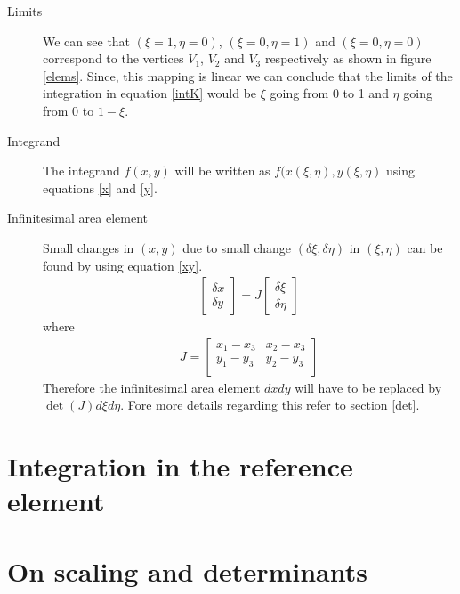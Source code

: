 \documentclass{article}
\begin{document}
\begin{description}
\item[Limits]
  We can see that
  $(\xi = 1, \eta = 0)$,
  $(\xi = 0, \eta = 1)$ and
  $(\xi = 0, \eta = 0)$
  correspond to the vertices
  $V_1$, $V_2$ and $V_3$ respectively
  as shown in figure \ref{elems}.
  Since, this mapping is linear we can conclude that
  the limits of the integration in equation \ref{intK}
  would be $\xi$ going from 0 to 1
  and $\eta$ going from 0 to $1 - \xi$.

\item[Integrand]
  The integrand $f(x,y)$
  will be written as $f(x(\xi,\eta), y(\xi,\eta)$
  using equations \ref{x} and \ref{y}.

\item[Infinitesimal area element]
  Small changes in $(x,y)$
  due to small change $(\delta \xi, \delta \eta)$ in $(\xi,\eta)$
  can be found by using equation \ref{xy}.
  \begin{align*}
    \begin{bmatrix} \delta x \\ \delta y \end{bmatrix} =
    J \begin{bmatrix} \delta \xi \\ \delta \eta \end{bmatrix}
  \end{align*}
  where
  \begin{align*}
    J = \begin{bmatrix}
      x_1 - x_3 & x_2 - x_3 \\
      y_1 - y_3 & y_2 - y_3 \\
    \end{bmatrix}
  \end{align*}
  Therefore the infinitesimal area element $dxdy$
  will have to be replaced by $\det (J) d\xi d\eta$.
  Fore more details regarding this refer to section \ref{det}.
\end{description}

\section{Integration in the reference element}

\section{On scaling and determinants \label{det}}
\end{document}
